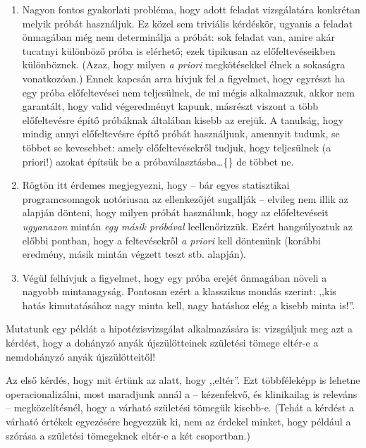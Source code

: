 \documentclass[
]{book}
\providecommand{\tightlist}{%
  \setlength{\itemsep}{0pt}\setlength{\parskip}{0pt}}
\begin{document}
\begin{enumerate}
\def\labelenumi{\arabic{enumi}.}
\tightlist
\item
  Nagyon fontos gyakorlati probléma, hogy adott feladat vizsgálatára konkrétan melyik próbát használjuk. Ez közel sem triviális kérdéskör, ugyanis a feladat önmagában még nem determinálja a próbát: sok feladat van, amire akár tucatnyi különböző próba is elérhető; ezek tipikusan az előfeltevéseikben különböznek. (Azaz, hogy milyen \emph{a priori} megkötésekkel élnek a sokaságra vonatkozóan.) Ennek kapcsán arra hívjuk fel a figyelmet, hogy egyrészt ha egy próba előfeltevései nem teljesülnek, de mi mégis alkalmazzuk, akkor nem garantált, hogy valid végeredményt kapunk, másrészt viszont a több előfeltevésre építő próbáknak általában kisebb az erejük. A tanulság, hogy mindig annyi előfeltevésre építő próbát használjunk, amennyit tudunk, se többet se kevesebbet: amely előfeltevésekről tudjuk, hogy teljesülnek (a priori!) azokat építsük be a próbaválasztásba\dots\{\} de többet ne.
\item
  Rögtön itt érdemes megjegyezni, hogy -- bár egyes statisztikai programcsomagok notóriusan az ellenkezőjét sugallják -- elvileg nem illik az alapján dönteni, hogy milyen próbát használunk, hogy az előfeltevéseit \emph{ugyanazon} mintán \emph{egy másik próbával} leellenőrizzük. Ezért hangsúlyoztuk az előbbi pontban, hogy a feltevésekről \emph{a priori} kell döntenünk (korábbi eredmény, másik mintán végzett teszt stb. alapján).
\item
  Végül felhívjuk a figyelmet, hogy egy próba erejét önmagában növeli a nagyobb mintanagyság. Pontosan ezért a klasszikus mondás szerint: ,,kis hatás kimutatásához nagy minta kell, nagy hatáshoz elég a kisebb minta is!''.
\end{enumerate}

Mutatunk egy példát a hipotézisvizsgálat alkalmazására is: vizsgáljuk meg azt a kérdést, hogy a dohányzó anyák újszülötteinek születési tömege eltér-e a nemdohányzó anyák újszülötteitől!

Az első kérdés, hogy mit értünk az alatt, hogy ,,eltér''. Ezt többféleképp is lehetne operacionalizálni, most maradjunk annál a -- kézenfekvő, és klinikailag is releváns -- megközelítésnél, hogy a várható születési tömegük kisebb-e. (Tehát a kérdést a várható értékek egyezésére hegyezzük ki, nem az érdekel minket, hogy például a szórása a születési tömegeknek eltér-e a két csoportban.)
\end{document}
